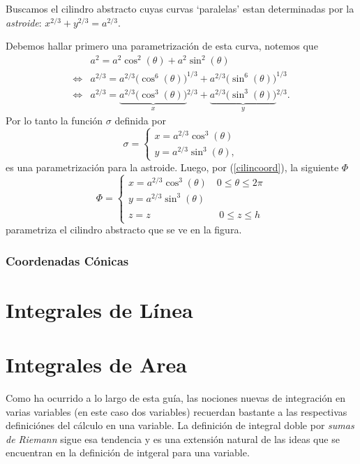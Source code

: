 \documentclass[mid,fleqn,draft,twoside]{notasdeclase}
\begin{document}
\begin{ejem}[Astroide]
	Buscamos el cilindro abstracto cuyas curvas `paralelas' estan determinadas por la \emph{astroide}: $x^{2/3} + y^{2/3} = a^{2/3}$.
	
	Debemos hallar primero una parametrización de esta curva, notemos que
	\begin{align*}
		\phantom{\iff}& a^2 = a^2\cos^2(\theta)+a^2\sin^2(\theta) \\
				  \iff& a^{2/3} = a^{2/3}\big(\cos^6(\theta)\big)^{1/3} + a^{2/3}\big(\sin^6(\theta)\big)^{1/3} \\
				  \iff& a^{2/3} = \underbrace{a^{2/3}\big(\cos^3(\theta)\big)}_x\hspace{0pt}^{2/3} + \underbrace{a^{2/3}\big(\sin^3(\theta)\big)}_y\hspace{0pt}^{2/3} .
	\end{align*}
	Por lo tanto la función $\sigma$ definida por
	\[ \sigma = \begin{cases}
	x = a^{2/3}\cos^3(\theta) \\
	y = a^{2/3}\sin^3(\theta),
	\end{cases} \]
	es una parametrización para la astroide. Luego, por (\ref{cilincoord}), la siguiente $\Phi$
	\[ \Phi = \begin{cases}
	x = a^{2/3}\cos^3(\theta) \quad 0\leq\theta\leq2\pi \\
	y = a^{2/3}\sin^3(\theta) \\
	z=z\phantom{a^{2/3}\sin^3(\theta)} \quad 0\leq z\leq h
	\end{cases} \]
	parametriza el cilindro abstracto que se ve en la figura.
\end{ejem}
\subsection{Coordenadas Cónicas}
\chapter{Integrales de Línea}

\chapter{Integrales de Area}
\noindent	
Como ha ocurrido a lo largo de esta guía, las nociones nuevas de integración en varias variables (en este caso dos variables) recuerdan bastante a las respectivas definiciónes del cálculo en una variable. La definición de integral doble por \emph{sumas de Riemann} sigue esa tendencia y es una extensión natural de las ideas que se encuentran en la definición de intgeral para una variable.
\end{document}
